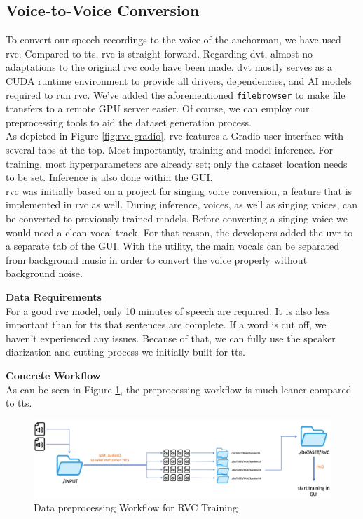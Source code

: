 \documentclass[
  a4paper,  %
  twoside,  %
  bibliography=totoc,
  headsepline,
  cleardoublepage=empty,
  parskip=half,
  draft=false
]{scrbook}
\begin{document}
\subsection{Voice-to-Voice Conversion}
To convert our speech recordings to the voice of the anchorman, we have used \gls{rvc}. Compared to \gls{tts}, \gls{rvc} is straight-forward. Regarding \gls*{dvt}, almost no adaptations to the original \gls*{rvc} \cite*{RVCProjectRetrievalbasedVoiceConversionWebUI2023} code have been made. \gls*{dvt} mostly serves as a CUDA runtime environment to provide all drivers, dependencies, and AI models required to run \gls{rvc}. We've added the aforementioned \verb|filebrowser| to make file transfers to a remote GPU server easier. Of course, we can employ our preprocessing tools to aid the dataset generation process.\\
As depicted in Figure \ref{fig:rvc-gradio}, \gls{rvc} features a Gradio user interface with several tabs at the top. Most importantly, training and model inference. For training, most hyperparameters are already set; only the dataset location needs to be set. Inference is also done within the GUI. \\
\gls{rvc} was initially based on a project for singing voice conversion, a feature that is implemented in \gls{rvc} as well. During inference, voices, as well as singing voices, can be converted to previously trained models. Before converting a singing voice we would need a clean vocal track. For that reason, the developers added the \gls{uvr} to a separate tab of the GUI. With the utility, the main vocals can be separated from background music in order to convert the voice properly without background noise.

\textbf{Data Requirements} \\
For a good \gls{rvc} model, only 10 minutes of speech are required. It is also less important than for \gls{tts} that sentences are complete. If a word is cut off, we haven't experienced any issues. Because of that, we can fully use the speaker diarization and cutting process we initially built for \gls{tts}. 

\textbf{Concrete Workflow} \\
As can be seen in Figure \ref{fig:rvc-wf}, the preprocessing workflow is much leaner compared to \gls{tts}.
\begin{figure}[h]

  \centering
  \includegraphics[width=1\textwidth]{./graphics/rvc/rvc-workflow.png}
  \caption{Data preprocessing Workflow for RVC Training}
  \label{fig:rvc-wf}
\end{figure}
\end{document}
